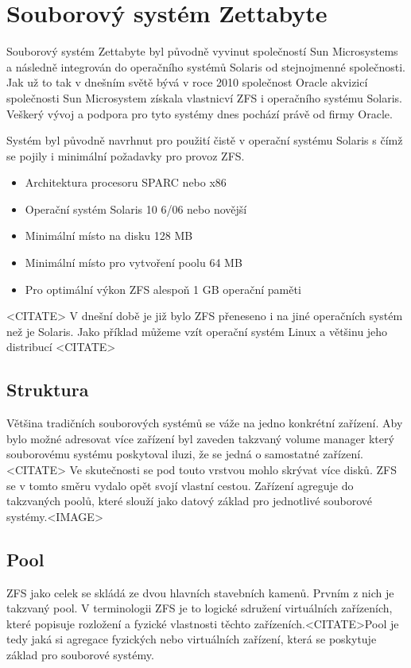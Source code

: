 \section{Souborový systém Zettabyte}
    Souborový systém Zettabyte byl původně vyvinut společností Sun Microsystems a následně integrován do operačního systémů Solaris od stejnojmenné společnosti.
    Jak už to tak v dnešním světě bývá v roce 2010 společnost Oracle akvizicí společnosti Sun Microsystem získala vlastnicví ZFS i operačního systému Solaris. Veškerý vývoj
    a podpora pro tyto systémy dnes pochází právě od firmy Oracle.

    Systém byl původně navrhnut pro použití čistě v operační systému Solaris s čímž se pojily i minimální požadavky pro provoz ZFS.
    \begin{itemize}
      \item Architektura procesoru SPARC nebo x86
      \item Operační systém Solaris 10 6/06 nebo novější
      \item Minimální místo na disku 128 MB
      \item Minimální místo pro vytvoření poolu 64 MB
      \item Pro optimální výkon ZFS alespoň 1 GB operační paměti
    \end{itemize}
    <CITATE>
    V dnešní době je již bylo ZFS přeneseno i na jiné operačních systém než je Solaris. Jako příklad můžeme vzít operační systém Linux a většinu jeho distribucí <CITATE>

    \subsection{Struktura}
    Většina tradičních souborových systémů se váže na jedno konkrétní zařízení. Aby bylo možné adresovat více zařízení byl zaveden takzvaný volume manager který souborovému
    systému poskytoval iluzi, že se jedná o samostatné zařízení. <CITATE> Ve skutečnosti se pod touto vrstvou mohlo skrývat více disků. ZFS se v tomto směru vydalo opět svojí
    vlastní cestou. Zařízení agreguje do takzvaných poolů, které slouží jako datový základ pro jednotlivé souborové systémy.<IMAGE>
    \subsection{Pool}
    ZFS jako celek se skládá ze dvou hlavních stavebních kamenů. Prvním z nich je takzvaný pool. V terminologii ZFS je to logické sdružení virtuálních zařízeních, které popisuje rozložení a fyzické vlastnosti těchto zařízeních.<CITATE>Pool je tedy jaká si agregace fyzických nebo virtuálních zařízení, která se poskytuje základ pro souborové systémy.

